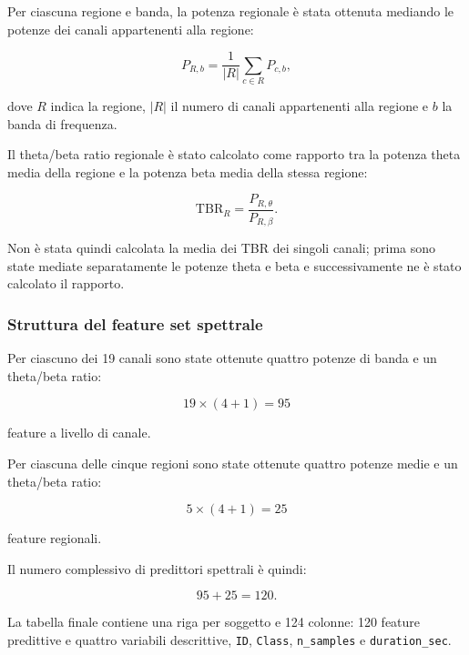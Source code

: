 Per ciascuna regione e banda, la potenza regionale è stata ottenuta
mediando le potenze dei canali appartenenti alla regione:

\begin{equation}
	P_{R,b}
	=
	\frac{1}{|R|}
	\sum_{c\in R}
	P_{c,b},
\end{equation}

dove $R$ indica la regione, $|R|$ il numero di canali appartenenti
alla regione e $b$ la banda di frequenza.

Il theta/beta ratio regionale è stato calcolato come rapporto tra la
potenza theta media della regione e la potenza beta media della stessa
regione:

\begin{equation}
	\mathrm{TBR}_{R}
	=
	\frac{P_{R,\theta}}{P_{R,\beta}}.
\end{equation}

Non è stata quindi calcolata la media dei TBR dei singoli canali;
prima sono state mediate separatamente le potenze theta e beta e
successivamente ne è stato calcolato il rapporto.


\subsubsection{Struttura del feature set spettrale}

Per ciascuno dei 19 canali sono state ottenute quattro potenze di banda
e un theta/beta ratio:

\begin{equation}
	19
	\times
	(4+1)
	=
	95
\end{equation}

feature a livello di canale.

Per ciascuna delle cinque regioni sono state ottenute quattro potenze
medie e un theta/beta ratio:

\begin{equation}
	5
	\times
	(4+1)
	=
	25
\end{equation}

feature regionali.

Il numero complessivo di predittori spettrali è quindi:

\begin{equation}
	95+25=120.
\end{equation}

La tabella finale contiene una riga per soggetto e 124 colonne:
120 feature predittive e quattro variabili descrittive,
\texttt{ID}, \texttt{Class}, \texttt{n\_samples} e
\texttt{duration\_sec}.


